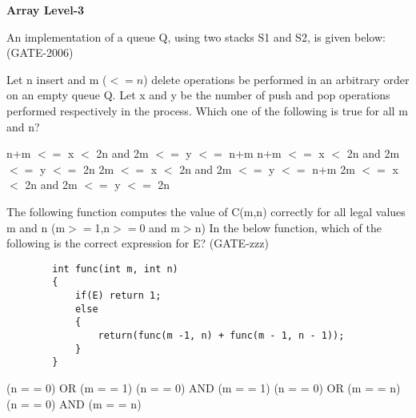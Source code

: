 
\centerline{\textbf{ \LARGE Array Level-3}}

\begin{questyle}
  \question  An implementation of a queue Q, using two stacks S1 and S2, is given below:  (GATE-2006)
    
    Let n insert and m (\(<=n\)) delete operations be performed in an arbitrary order on an empty queue Q.
    Let x and y be the number of push and pop operations performed respectively in the process.
    Which one of the following is true for all m and n?

  \begin{choices}
    \CorrectChoice  n+m \(<=\) x \(<\) 2n and 2m \(<=\) y \(<=\) n+m
    \choice         n+m \(<=\) x \(<\) 2n and 2m \(<=\) y \(<=\) 2n
    \choice         2m \(<=\) x \(<\) 2n and 2m \(<=\) y \(<=\) n+m
    \choice         2m \(<=\) x \(<\) 2n and 2m \(<=\) y \(<=\) 2n
  \end{choices}
\end{questyle}


\begin{questyle}
  \question  The following function computes the value of C(m,n) correctly for all legal values m and n (m\(>=\)1,n\(>=\)0 and m\(>\)n)
            In the below function, which of the following is the correct expression for E? (GATE-zzz)

    \begin{lstlisting}
        int func(int m, int n)
        {
            if(E) return 1;
            else
            {
                return(func(m -1, n) + func(m - 1, n - 1));
            }
        }
    \end{lstlisting}

  \begin{choices}
    \CorrectChoice  (n = = 0) OR  (m = = 1)
    \choice         (n = = 0) AND (m = = 1)
    \choice         (n = = 0) OR  (m = = n)
    \choice         (n = = 0) AND (m = = n)
  \end{choices}
\end{questyle}
